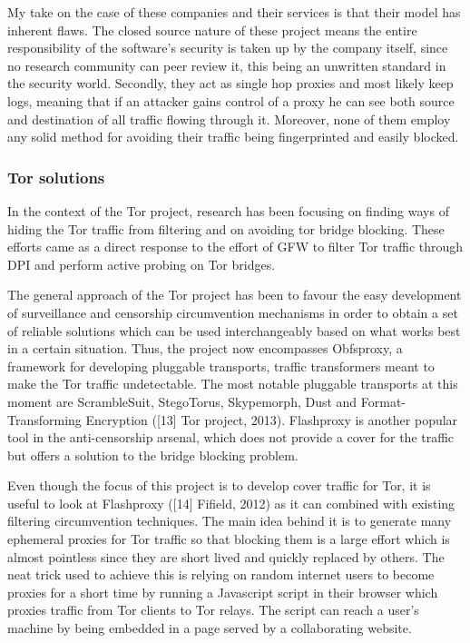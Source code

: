 \documentclass[11pt]{article} %
\begin{document}
My take on the case of these companies and their services is that their model has inherent flaws.  The closed source nature of these project means the entire responsibility of the software’s security is taken up by the company itself, since no research community can peer review it, this being an unwritten standard in the security world. Secondly, they act as single hop proxies and most likely keep logs, meaning that if an attacker gains control of a proxy he can see both source and destination of all traffic flowing through it. Moreover, none of them employ any solid method for avoiding their traffic being fingerprinted and easily blocked.

\subsubsection{Tor solutions}

In the context of the Tor project, research has been focusing on finding ways of hiding the Tor traffic from filtering and on avoiding tor bridge blocking. These efforts came as a direct response to the effort of GFW to filter Tor traffic through DPI and perform active probing on Tor bridges.

The general approach of the Tor project has been to favour the easy development of surveillance and censorship circumvention mechanisms in order to obtain a set of reliable solutions which can be used interchangeably based on what works best in a certain situation. Thus, the project now encompasses Obfsproxy, a framework for developing pluggable transports, traffic transformers meant to make the Tor traffic undetectable. The most notable pluggable transports at this moment are ScrambleSuit, StegoTorus, Skypemorph, Dust and Format-Transforming Encryption ([13] Tor project, 2013). Flashproxy is another popular tool in the anti-censorship arsenal, which does not provide a cover for the traffic but offers a solution to the bridge blocking problem.


Even though the focus of this project is to develop cover traffic for Tor, it is useful to look at Flashproxy ([14] Fifield, 2012) as it can combined with existing filtering circumvention techniques. The main idea behind it is to generate many ephemeral proxies for Tor traffic so that blocking them is a large effort which is almost pointless since they are short lived and quickly replaced by others. The neat trick used to achieve this is relying on random internet users to become proxies for a short time by running a Javascript script in their browser which proxies traffic from Tor clients to Tor relays. The script can reach a user’s machine by being embedded in a page served by a collaborating website. 
\end{document}
